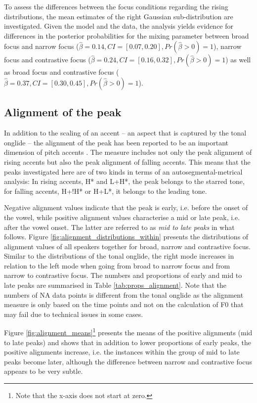 To assess the differences between the focus conditions regarding the rising distributions, the mean estimates of the right Gaussian sub-distribution are investigated. Given the model and the data, the analysis yields evidence for differences in the posterior probabilities for the mixing parameter between broad focus and narrow focus ($\hat\beta=0.14, CI=[0.07, 0.20], \allowbreak Pr(\hat\beta>0)=1$), narrow focus and contrastive focus ($\hat\beta=0.24, CI=[0.16, 0.32], \allowbreak Pr(\hat\beta>0)=1$) as well as broad focus and contrastive focus ($\hat\beta=0.37, CI=[0.30, 0.45], \allowbreak Pr(\hat\beta>0)=1$).

\subsection{Alignment of the peak}

In addition to the scaling of an accent -- an aspect that is captured by the tonal onglide -- the alignment of the peak has been reported to be an important dimension of pitch accents \citep[see also Chapter \ref{chapter_prosody}]{Gussenhoven2004, Ladd2008, LaddMorton1997}. The measure includes not only the peak alignment of rising accents but also the peak alignment of falling accents. This means that the peaks investigated here are of two kinds in terms of an autosegmental-metrical analysis: In rising accents, H* and L+H*, the peak belongs to the starred tone, for falling accents, H+!H* or H+L*, it belongs to the leading tone.

Negative alignment values indicate that the peak is early, i.e. before the onset of the vowel, while positive alignment values characterise a mid or late peak, i.e. after the vowel onset. The latter are referred to as \emph{mid to late peaks} in what follows. Figure \ref{fig:alignment_distributions_within} presents the distributions of alignment values of all speakers together for broad, narrow and contrastive focus. Similar to the distributions of the tonal onglide, the right mode increases in relation to the left mode when going from broad to narrow focus and from narrow to contrastive focus. The numbers and proportions of early and mid to late peaks are summarised in Table \ref{tab:props_alignment}. Note that the numbers of NA data points is different from the tonal onglide as the alignment measure is only based on the time points and not on the calculation of F0 that may fail due to technical issues in some cases.

Figure \ref{fig:alignment_means}\footnote{Note that the x-axis does not start at zero.} presents the means of the positive alignments (mid to late peaks) and shows that in addition to lower proportions of early peaks, the positive alignments increase, i.e. the instances within the group of mid to late peaks become later, although the difference between narrow and contrastive focus appears to be very subtle.

